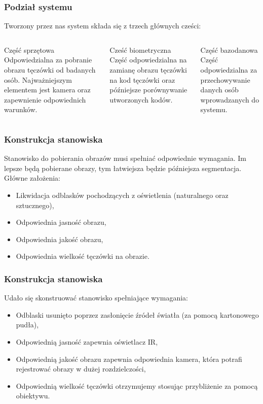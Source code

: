 \documentclass{beamer}
\begin{document}

\begin{frame}
\frametitle{Podział systemu}

Tworzony przez nas system składa się z trzech głównych cześci:
\begin{columns}[t]
\begin{block}{Część sprzętowa}
Odpowiedzialna za pobranie obrazu tęczówki od badanych osób. Najważniejszym elementem jest kamera oraz zapewnienie odpowiednich warunków.
\end{block}
\begin{block}{Cześć biometryczna}
Część odpowiedzialna na zamianę obrazu tęczówki na kod tęczówki oraz późniejsze porównywanie utworzonych kodów.
\end{block}
\begin{block}{Część bazodanowa}
Część odpowiedzialna za przechowywanie danych osób wprowadzanych do systemu.
\end{block}
\end{columns} 

\end{frame}


\begin{frame}
\frametitle{Konstrukcja stanowiska}
Stanowisko do pobierania obrazów musi spełniać odpowiednie wymagania. Im lepsze będą pobierane obrazy, tym łatwiejsza będzie późniejsza segmentacja. Główne założenia:
\begin{itemize}
\item Likwidacja odblasków pochodzących z oświetlenia (naturalnego oraz sztucznego),
\item Odpowiednia jasność obrazu,
\item Odpowiednia jakość obrazu,
\item Odpowiednia wielkość tęczówki na obrazie.
\end{itemize}
\end{frame}

\begin{frame}
\frametitle{Konstrukcja stanowiska}
Udało się skonstruować stanowisko spełniające wymagania:
\begin{itemize}
\item Odblaski usunięto poprzez zasłonięcie źródeł światła (za pomocą kartonowego pudła),
\item Odpowiednią jasność zapewnia oświetlacz IR,
\item Odpowiednią jakość obrazu zapewnia odpowiednia kamera, która potrafi rejestrować obrazy w dużej rozdzielczości,
\item Odpowiednią wielkość tęczówki otrzymujemy stosując przybliżenie za pomocą obiektywu.
\end{itemize}
\end{frame}
\end{document}
